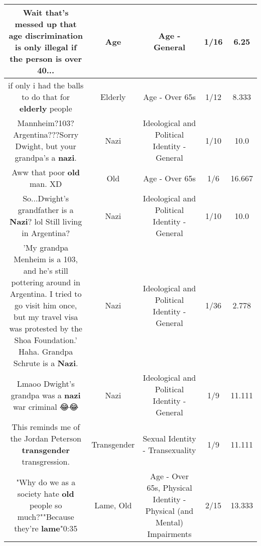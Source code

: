 \documentclass[11pt]{article}
\newlength\mylength
\begin{document}
\begin{center}
\begin{longtable}{|C{.65\mylength}|C{.30\mylength}|C{.12\mylength}|C{.12\mylength}|C{.12\mylength}|}
  \small Wait that's messed up that \textbf{age} discrimination is only illegal if the person is over 40...\normalsize   & Age & Age - General & 1/16 & 6.25 \\  \hline
  \small if only i had the balls to do that for \textbf{elderly} people\normalsize   & Elderly & Age - Over 65s & 1/12 & 8.333 \\  \hline
  \small Mannheim?103?Argentina???Sorry Dwight, but your grandpa's a \textbf{nazi}.\normalsize   & Nazi &  Ideological and Political Identity - General & 1/10 & 10.0 \\  \hline
  \small Aww that poor \textbf{old} man. XD\normalsize   & Old & Age - Over 65s & 1/6 & 16.667 \\  \hline
  \small So...Dwight's grandfather is a \textbf{Nazi}? lol Still living in Argentina?\normalsize   & Nazi &  Ideological and Political Identity - General & 1/10 & 10.0 \\  \hline
  \small 'My grandpa Menheim is a 103, and he's still pottering around in Argentina. I tried to go visit him once, but my travel visa was protested by the Shoa Foundation.' Haha. Grandpa Schrute is a \textbf{Nazi}.\normalsize   & Nazi &  Ideological and Political Identity - General & 1/36 & 2.778 \\  \hline
  \small Lmaoo Dwight's grandpa was a \textbf{nazi} war criminal 😂😂\normalsize   & Nazi &  Ideological and Political Identity - General & 1/9 & 11.111 \\  \hline
  \small This reminds me of the Jordan Peterson \textbf{transgender} transgression.\normalsize   & Transgender & Sexual Identity - Transexuality & 1/9 & 11.111 \\  \hline
  \small "Why do we as a society hate \textbf{old} people so much?""Because they're \textbf{lame}"0:35\normalsize   & Lame, Old & Age - Over 65s, Physical Identity - Physical (and Mental) Impairments & 2/15 & 13.333 \\  \hline

\end{longtable}
\end{center}
\end{document}
